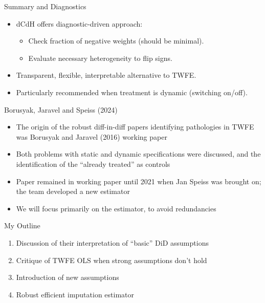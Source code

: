 \documentclass{beamer}
\begin{document}
\begin{frame}{Summary and Diagnostics}
\begin{itemize}
\item dCdH offers diagnostic-driven approach:
\begin{itemize}
    \item Check fraction of negative weights (should be minimal).
    \item Evaluate necessary heterogeneity to flip signs.
\end{itemize}
\item Transparent, flexible, interpretable alternative to TWFE.
\item Particularly recommended when treatment is dynamic (switching on/off).
\end{itemize}
\end{frame}







\begin{frame}{Borusyak, Jaravel and Speiss (2024)}

\begin{itemize}

\item The origin of the robust diff-in-diff papers identifying pathologies in TWFE was Borusyak and Jaravel (2016) working paper
\item Both problems with static and dynamic specifications were discussed, and the identification of the ``already treated'' as controls
\item Paper remained in working paper until 2021 when Jan Speiss was brought on; the team developed a new estimator
\item We will focus primarily on the estimator, to avoid redundancies

\end{itemize}

\end{frame}

\begin{frame}{My Outline}

\begin{enumerate}
\item Discussion of their interpretation of ``basic'' DiD assumptions
\item Critique of TWFE OLS when strong assumptions don't hold
\item Introduction of new assumptions
\item Robust efficient imputation estimator
\end{enumerate}

\end{frame}
\end{document}
